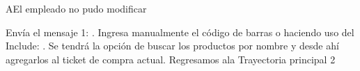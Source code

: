 
\begin{UCtrayectoriaA}{A}{El empleado no pudo modificar}

	\UCpaso [\UCsist] Envía el mensaje 1: .
	\UCpaso [\UCactor] Ingresa manualmente el código de barras o haciendo uso del  Include: . Se tendrá la opción de buscar los productos por nombre y desde ahí agregarlos al ticket de compra actual.	
	\UCpaso [\UCsist]Regresamos ala Trayectoria principal 2
\end{UCtrayectoriaA}
